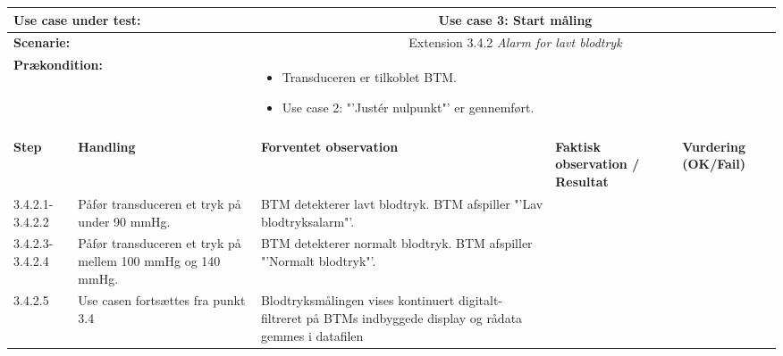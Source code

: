 \begin{tabular}{|p{1cm}|p{3cm}|p{4cm}|p{4cm}|p{2cm}|}
\hline
\multicolumn{2}{|p{3cm}|}{\textbf{Use case under test:}} & \multicolumn{3}{c|}{Use case 3: Start måling} \\\hline

\multicolumn{2}{|p{3cm}|}{\textbf{Scenarie:}} & \multicolumn{3}{c|}{Extension 3.4.2 \textit{Alarm for lavt blodtryk}} \\\hline

\multicolumn{2}{|p{3cm}|}{\textbf{Prækondition:}}  & \multicolumn{3}{l|}{\parbox{0.6\textwidth}{
\begin{itemize}[label=$\circ$]
\item Transduceren er tilkoblet BTM.
\item Use case 2: "'Justér nulpunkt"' er gennemført.  
\end{itemize} }}\\\hline

\multicolumn{5}{|c|}{} \\\hline

\textbf{Step} & \textbf{Handling} & \textbf{Forventet observation} & \textbf{Faktisk observation / Resultat} & \textbf{Vurdering (OK/Fail)}\\\hline

3.4.2.1-3.4.2.2 & Påfør transduceren et tryk på under 90 mmHg. & BTM detekterer lavt blodtryk. BTM afspiller "'Lav blodtryksalarm"'.  & & 
\\\hline
3.4.2.3-3.4.2.4 & Påfør transduceren et tryk på mellem 100 mmHg og 140 mmHg. & BTM detekterer normalt blodtryk. BTM afspiller "'Normalt blodtryk"'.  & & 
\\\hline
3.4.2.5 & Use casen fortsættes fra punkt 3.4 & Blodtryksmålingen vises kontinuert digitalt-filtreret på BTMs indbyggede display og rådata gemmes i datafilen & & 
\\\hline
\end{tabular}



